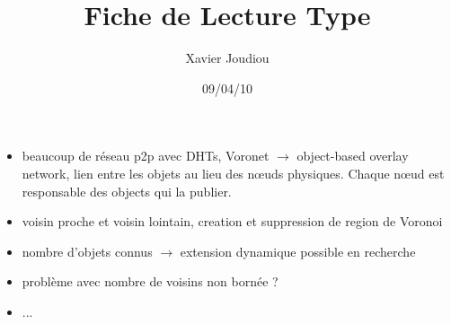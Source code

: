 \documentclass[11pt,a4paper]{article}
\title{Fiche de Lecture Type}
\author{Xavier Joudiou}
\date{09/04/10}
\begin{document}
	
  \begin{itemize}
  \renewcommand{\labelitemi}{$\Rightarrow$}
	\item beaucoup de réseau p2p avec DHTs, Voronet $\rightarrow$ object-based overlay network, lien entre les objets au lieu des nœuds physiques. Chaque nœud est responsable des objects qui la publier.
	\item voisin proche et voisin lointain, creation et suppression de region de Voronoi
	\item nombre d'objets connus $\rightarrow$ extension dynamique possible en recherche
	\item problème avec nombre de voisins non bornée ? 
	\item ...
  \end{itemize}
\end{document}
